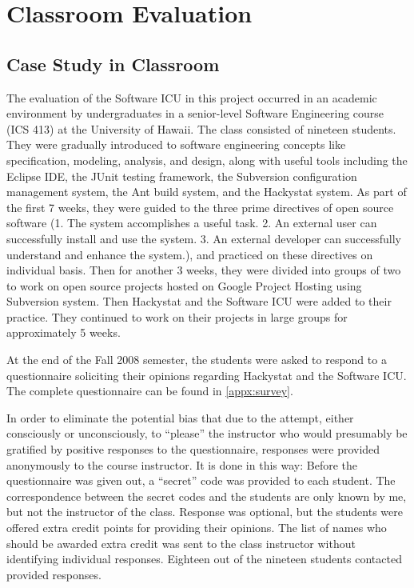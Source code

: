 \chapter{Classroom Evaluation}

\section{Case Study in Classroom}
The evaluation of the Software ICU in this project occurred in an academic environment by undergraduates in a senior-level Software Engineering course (ICS 413) at the University of Hawaii. The class consisted of nineteen students. They were gradually introduced to software engineering concepts like specification, modeling, analysis, and design, along with useful tools including the Eclipse IDE, the JUnit testing framework, the Subversion configuration management system, the Ant build system, and the Hackystat system. As part of the first 7 weeks, they were guided to the three prime directives of open source software (1. The system accomplishes a useful task. 2. An external user can successfully install and use the system. 3. An external developer can successfully understand and enhance the system.), and practiced on these directives on individual basis. Then for another 3 weeks, they were divided into groups of two to work on open source projects hosted on Google Project Hosting using Subversion system. Then Hackystat and the Software ICU were added to their practice. They continued to work on their projects in large groups for approximately 5 weeks.

At the end of the Fall 2008 semester, the students were asked to respond to a questionnaire soliciting their opinions regarding Hackystat and the Software ICU. The complete questionnaire can be found in \autoref{appx:survey}. 

In order to eliminate the potential bias that due to the attempt, either consciously or unconsciously, to ``please'' the instructor who would presumably be gratified by positive responses to the questionnaire, responses were provided anonymously to the course instructor. It is done in this way: Before the questionnaire was given out, a ``secret'' code was provided to each student. The correspondence between the secret codes and the students are only known by me, but not the instructor of the class. Response was optional, but the students were offered extra credit points for providing their opinions. The list of names who should be awarded extra credit was sent to the class instructor without identifying individual responses. Eighteen out of the nineteen students contacted provided responses. 

